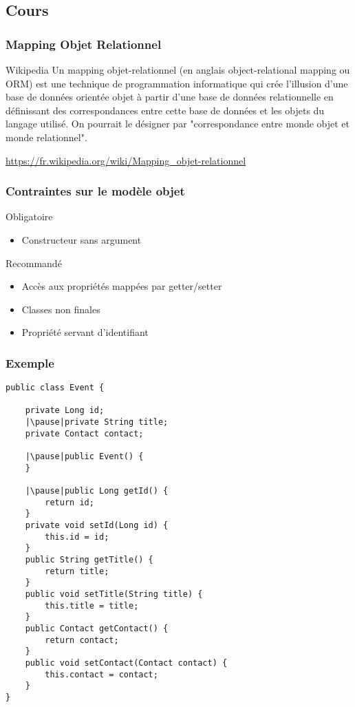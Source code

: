 \documentclass[t,12pt]{beamer}
\begin{document}
\subsection{Cours}

\begin{frame}
	\frametitle{Mapping Objet Relationnel}

	\begin{block}{Wikipedia}
		Un mapping objet-relationnel (en anglais object-relational mapping ou ORM) est une technique de programmation informatique qui cr\'ee l'illusion d'une base de donn\'ees orient\'ee objet \`a partir d'une base de donn\'ees relationnelle en d\'efinissant des correspondances entre cette base de donn\'ees et les objets du langage utilis\'e. On pourrait le d\'esigner par "correspondance entre monde objet et monde relationnel".
	\end{block}
	\url{https://fr.wikipedia.org/wiki/Mapping_objet-relationnel}

\end{frame}

\begin{frame}
	\frametitle{Contraintes sur le mod\`ele objet}

	\begin{alertblock}{Obligatoire}
		\begin{itemize}
			\item Constructeur sans argument
		\end{itemize}
	\end{alertblock}

	\begin{block}{Recommand\'e}
		\begin{itemize}
			\item Acc\`es aux propri\'et\'es mapp\'ees par getter/setter
			\item Classes non finales
			\item Propri\'et\'e servant d'identifiant
		\end{itemize}
	\end{block}
\end{frame}

\begin{frame}[fragile]
	\frametitle{Exemple}

	\begin{lstlisting}[frame=single, basicstyle=\tiny]
public class Event {

    private Long id;
    |\pause|private String title;
    private Contact contact;

    |\pause|public Event() {
    }

    |\pause|public Long getId() {
        return id;
    }
    private void setId(Long id) {
        this.id = id;
    }
    public String getTitle() {
        return title;
    }
    public void setTitle(String title) {
        this.title = title;
    }
    public Contact getContact() {
        return contact;
    }
    public void setContact(Contact contact) {
        this.contact = contact;
    }
}
	\end{lstlisting}
\end{frame}
\end{document}
